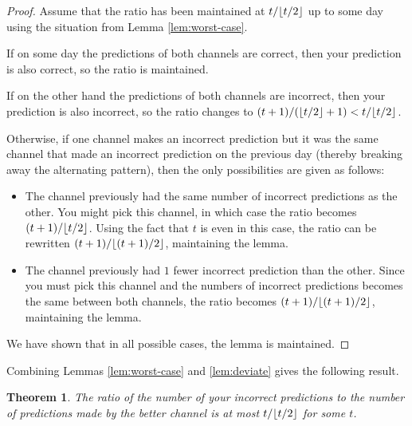 \documentclass[a4paper,12pt]{article}
\DeclarePairedDelimiter \floor{\lfloor}{\rfloor}
\newtheorem{thm}{Theorem}[subsection]
\theoremstyle{remark}
\begin{document}
\begin{proof}
    Assume that the ratio has been maintained at $t/\floor{t/2}$ up to some day using the situation from Lemma \ref{lem:worst-case}. \par
    If on some day the predictions of both channels are correct, then your prediction is also correct, so the ratio is maintained. \par
    If on the other hand the predictions of both channels are incorrect, then your prediction is also incorrect, so the ratio changes to $(t + 1)/(\floor{t/2} + 1) < t/\floor{t/2}$. \par
    Otherwise, if one channel makes an incorrect prediction but it was the same channel that made an incorrect prediction on the previous day (thereby breaking away the alternating pattern), then the only possibilities are given as follows:
    \begin{itemize}
        \item
            The channel previously had the same number of incorrect predictions as the other. You might pick this channel, in which case the ratio becomes $(t + 1)/\floor{t/2}$. Using the fact that $t$ is even in this case, the ratio can be rewritten $(t + 1)/\floor{(t + 1)/2}$, maintaining the lemma.
        \item
            The channel previously had $1$ fewer incorrect prediction than the other. Since you must pick this channel and the numbers of incorrect predictions becomes the same between both channels, the ratio becomes $(t + 1)/\floor{(t + 1)/2}$, maintaining the lemma.
    \end{itemize}
    We have shown that in all possible cases, the lemma is maintained.
\end{proof}
Combining Lemmas \ref{lem:worst-case} and \ref{lem:deviate} gives the following result.
\begin{thm}
    The ratio of the number of your incorrect predictions to the number of predictions made by the better channel is at most $t/\floor{t/2}$ for some $t$.
\end{thm}
\end{document}
